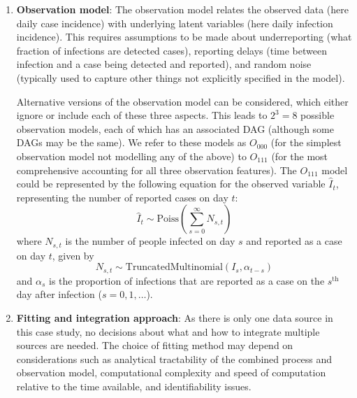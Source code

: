 \documentclass{article}
\begin{document}
\begin{enumerate}
\item \textbf{Observation model}: The observation model relates the observed data (here daily case incidence) with underlying latent variables (here daily infection incidence). 
This requires assumptions to be made about underreporting (what fraction of infections are detected cases), reporting delays (time between infection and a case being detected and reported), and random noise (typically used to capture other things not explicitly specified in the model).

Alternative versions of the observation model can be considered, which either ignore or include each of these three aspects. This leads to $2^3=8$ possible observation models, each of which has an associated DAG (although some DAGs may be the same).
We refer to these models as $O_{000}$ (for the simplest observation model not modelling any of the above) to $O_{111}$ (for the most comprehensive accounting for all three observation features). 
The $O_{111}$ model could be represented by the following equation for the observed variable $\hat{I}_t$, representing the number of reported cases on day $t$:
\begin{equation}
    \hat{I}_t \sim \mathrm{Poiss}\left( \sum_{s=0}^\infty N_{s,t}\right)
\end{equation}
where $N_{s,t}$ is the number of people infected on day $s$ and reported as a case on day $t$, given by
\begin{equation}
    N_{s,t} \sim \mathrm{TruncatedMultinomial}\left( I_s, \alpha_{t-s}\right) 
\end{equation}
and $\alpha_s$ is the proportion of infections that are reported as a case on the $s^\mathrm{th}$ day after infection ($s=0,1,\ldots$). 


\item \textbf{Fitting and integration approach}: As there is only one data source in this case study, no decisions about what and how to integrate multiple sources are needed. The choice of fitting method may depend on considerations such as analytical tractability of the combined process and observation model, computational complexity and speed of computation relative to the time available, and identifiability issues. 
 


\end{enumerate}
\end{document}
